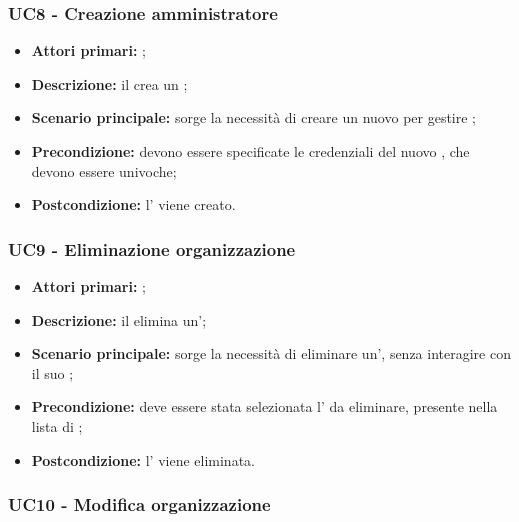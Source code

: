 \documentclass[../analisi-dei-requisiti]{subfiles}
\begin{document}
\subsubsection{UC8 - Creazione amministratore}
\label{subsub:UC8}

\begin{itemize}
  \item \textbf{Attori primari:} ;
  \item \textbf{Descrizione:} il  crea un  ;
  \item \textbf{Scenario principale:} sorge la necessità di creare un nuovo  per gestire ;
  \item \textbf{Precondizione:} devono essere specificate le credenziali del nuovo , che devono essere univoche;
  \item \textbf{Postcondizione:} l' viene creato.

\end{itemize}

\subsubsection{UC9 - Eliminazione organizzazione}
\label{subsub:UC9}

\begin{itemize}
  \item \textbf{Attori primari:} ;
  \item \textbf{Descrizione:} il  elimina un';
  \item \textbf{Scenario principale:} sorge la necessità di eliminare un', senza interagire con il suo ;
  \item \textbf{Precondizione:} deve essere stata selezionata l' da eliminare, presente nella lista di ;
  \item \textbf{Postcondizione:} l' viene eliminata.

\end{itemize}


\subsubsection{UC10 - Modifica organizzazione}
\label{subsub:UC10}
\end{document}
